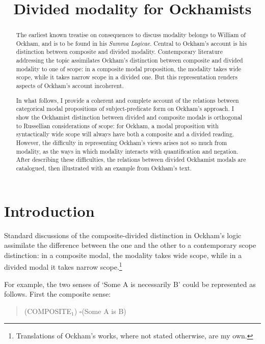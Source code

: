 \documentclass[a4paper]{article}
\title{Divided modality for Ockhamists}
\author{}
\begin{document}
\maketitle

\begin{abstract}
	The earliest known treatise on consequences to discuss modality belongs to William of Ockham, and is to be found in his \textit{Summa Logicae}. Central to Ockham's account is his distinction between composite and divided modality. Contemporary literature addressing the topic assimilates Ockham's distinction between composite and divided modality to one of scope: in a composite modal proposition, the modality takes wide scope, while it takes narrow scope in a divided one. But this representation renders aspects of Ockham's account incoherent. 
	
	In what follows, I provide a coherent and complete account of the relations between categorical modal propositions of subject-predicate form on Ockham's approach. I show the Ockhamist distinction between divided and composite modals is orthogonal to Russellian considerations of scope: for Ockham, a modal proposition with syntactically wide scope will always have both a composite and a divided reading. However, the difficulty in representing Ockham's views arises not so much from modality, as the ways in which modality interacts with quantification and negation. After describing these difficulties, the relations between divided Ockhamist modals are catalogued, then illustrated with an example from Ockham's text. 
\end{abstract}

\section{Introduction}
Standard discussions of the composite-divided distinction in Ockham's logic assimilate the difference between the one and the other to a contemporary scope distinction: in a composite modal, the modality takes wide scope, while in a divided modal it takes narrow scope.\footnote{Translations of Ockham's works, where not stated otherwise, are my own.}

For example, the two senses of `Some A is necessarily B' could be represented as follows. First the composite sense: 

\begin{quote}
(COMPOSITE$_{1}$) $\square$(Some A is B)
\end{quote}
\end{document}

